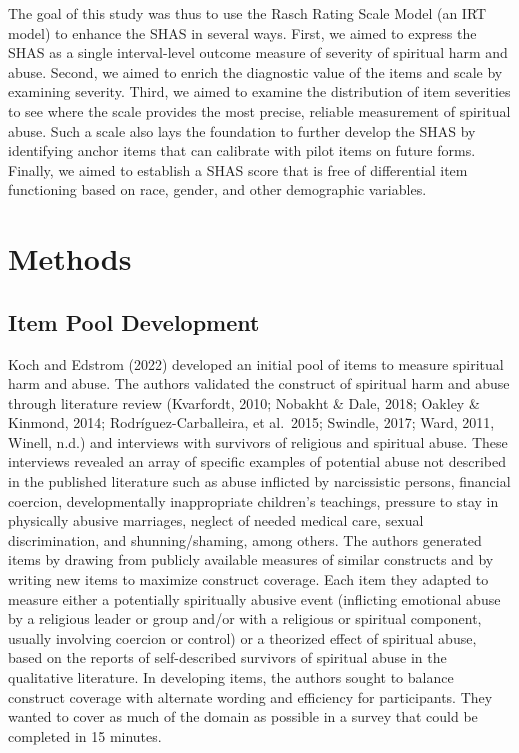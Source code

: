 \documentclass[
  letterpaper,
  DIV=11,
  numbers=noendperiod]{scrreport}
\begin{document}
The goal of this study was thus to use the Rasch Rating Scale Model (an
IRT model) to enhance the SHAS in several ways. First, we aimed to
express the SHAS as a single interval-level outcome measure of severity
of spiritual harm and abuse. Second, we aimed to enrich the diagnostic
value of the items and scale by examining severity. Third, we aimed to
examine the distribution of item severities to see where the scale
provides the most precise, reliable measurement of spiritual abuse. Such
a scale also lays the foundation to further develop the SHAS by
identifying anchor items that can calibrate with pilot items on future
forms. Finally, we aimed to establish a SHAS score that is free of
differential item functioning based on race, gender, and other
demographic variables.


\hypertarget{methods}{%
\chapter*{Methods}\label{methods}}

\hypertarget{item-pool-development}{%
\section*{Item Pool Development}\label{item-pool-development}}

Koch and Edstrom (2022) developed an initial pool of items to measure
spiritual harm and abuse. The authors validated the construct of
spiritual harm and abuse through literature review (Kvarfordt, 2010;
Nobakht \& Dale, 2018; Oakley \& Kinmond, 2014; Rodríguez-Carballeira,
et al.~2015; Swindle, 2017; Ward, 2011, Winell, n.d.) and interviews
with survivors of religious and spiritual abuse. These interviews
revealed an array of specific examples of potential abuse not described
in the published literature such as abuse inflicted by narcissistic
persons, financial coercion, developmentally inappropriate children's
teachings, pressure to stay in physically abusive marriages, neglect of
needed medical care, sexual discrimination, and shunning/shaming, among
others. The authors generated items by drawing from publicly available
measures of similar constructs and by writing new items to maximize
construct coverage. Each item they adapted to measure either a
potentially spiritually abusive event (inflicting emotional abuse by a
religious leader or group and/or with a religious or spiritual
component, usually involving coercion or control) or a theorized effect
of spiritual abuse, based on the reports of self-described survivors of
spiritual abuse in the qualitative literature. In developing items, the
authors sought to balance construct coverage with alternate wording and
efficiency for participants. They wanted to cover as much of the domain
as possible in a survey that could be completed in 15 minutes.
\end{document}
